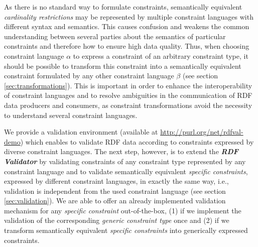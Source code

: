 \documentclass{llncs}
\newcommand{\ms}[1]{\texttt{#1}}
\begin{document}
As there is no standard way to formulate constraints, 
semantically equivalent \emph{cardinality restrictions} may be represented by multiple constraint languages with different syntax and semantics.
This causes confusion and weakens the common understanding between several parties about the semantics of particular constraints and therefore how to ensure high data quality. 
Thus, when choosing constraint language \ms{$\alpha$} to express a constraint of an arbitrary constraint type, it should be possible to transform this constraint into a semantically equivalent constraint formulated by any other constraint language \ms{$\beta$} (see section \ref{sec:transformations}). 
This is important in order to enhance the interoperability of constraint languages and to resolve ambiguities in the communication of RDF data producers and consumers, 
as constraint transformations avoid the necessity to understand several constraint languages.

We provide a validation environment (available at \url{http://purl.org/net/rdfval-demo}) which enables to validate RDF data according to constraints expressed by diverse  constraint languages.
The next step, however, is to extend the \textbf{\emph{RDF Validator}} by validating constraints of any constraint type represented by any constraint language and 
to validate semantically equivalent \emph{specific constraints}, expressed by different constraint languages, in exactly the same way, 
i.e., validation is independent from the used constraint language (see section \ref{sec:validation}). 
We are able to offer an already implemented validation mechanism for any \emph{specific constraint} out-of-the-box, 
(1) if we implement the validation of the corresponding \emph{generic constraint type} once and 
(2) if we transform semantically equivalent \emph{specific constraints} into generically expressed constraints.  


\end{document}
